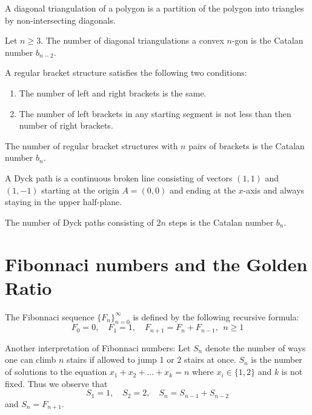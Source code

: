 \begin{definition}
A diagonal triangulation of a polygon is a partition of the polygon into triangles by non-intersecting diagonals.
\end{definition}
\begin{lemma}
Let $n\ge3$. The number of diagonal triangulations a convex $n$-gon is the Catalan number $b_{n-2}$.
\end{lemma}
\begin{definition}[Parentheses]
A regular bracket structure satisfies the following two conditions:
\begin{enumerate}
\item The number of left and right brackets is the same.
\item The number of left brackets in any starting segment is not less than then number of right brackets.
\end{enumerate}
\end{definition}
\begin{lemma}
The number of regular bracket structures with $n$ pairs of brackets is the Catalan number $b_{n}$.
\end{lemma}
\begin{definition}
A Dyck path is a continuous broken line consisting of vectors $(1,1)$ and $(1,-1)$ starting at the origin $A=(0,0)$ and ending at the $x$-axis and always staying in the upper half-plane.
\end{definition}
\begin{lemma}
The number of Dyck paths consisting of $2n$ steps is the Catalan number $b_{n}$.
\end{lemma}

\section{Fibonnaci numbers and the Golden Ratio}

\begin{definition}
The Fibonnaci sequence $\{ F_{n} \}_{n=0}^{\infty}$ is defined by the following recursive formula:
$$
F_{0}=0,\quad F_{1}=1,\quad F_{n+1}=F_{n}+F_{n-1},~~ n \ge 1
$$
\end{definition}

Another interpretation of Fibonnaci numbers: Let $S_{n}$ denote the number of ways one can climb $n$ stairs if allowed to jump 1 or 2 stairs at once. $S_{n}$ is the number of solutions to the equation $x_{1}+x_{2}+\dots +x_{k}=n$ where $x_{i}\in \{ 1, 2\}$ and $k$ is not fixed. Thus we observe that
$$
S_{1}=1,\quad S_{2}=2,\quad S_{n}=S_{n-1}+S_{n-2}
$$
and $S_{n}=F_{n+1}$.

